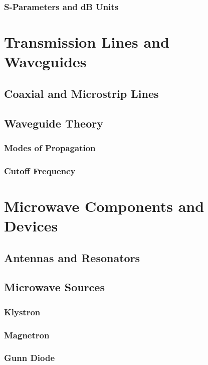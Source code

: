 \documentclass[11pt]{article}
\begin{document}
\subsubsection{S-Parameters and dB Units}

\section{Transmission Lines and Waveguides} \label{sec:waveguides}
\subsection{Coaxial and Microstrip Lines} \label{subsec:coaxial_microstrip}
\subsection{Waveguide Theory} \label{subsec:waveguide_theory}
\subsubsection{Modes of Propagation}
\subsubsection{Cutoff Frequency}

\section{Microwave Components and Devices} \label{sec:microwave_components}
\subsection{Antennas and Resonators} \label{subsec:antennas_resonators}
\subsection{Microwave Sources} \label{subsec:microwave_sources}
\subsubsection{Klystron}
\subsubsection{Magnetron}
\subsubsection{Gunn Diode}
\end{document}
